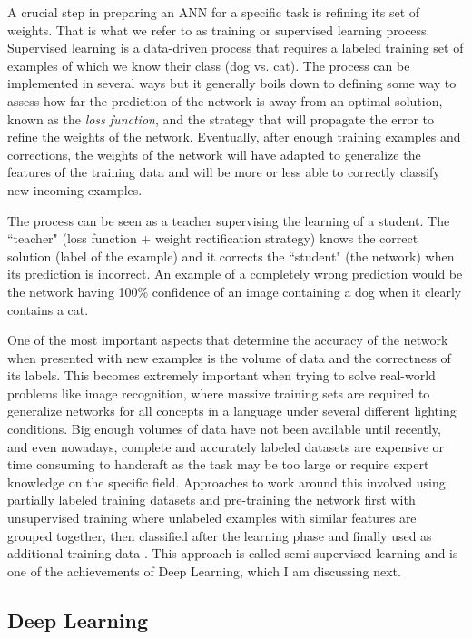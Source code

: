 A crucial step in preparing an ANN for a specific task is refining its set of weights.
That is what we refer to as training or supervised learning process.
Supervised learning is a data-driven process that requires a labeled training set of examples of which we know their class (dog vs. cat).
The process can be implemented in several ways but it generally boils down to defining some way to assess how far the prediction of the network is away from an optimal solution, known as the \emph{loss function}, and the strategy that will propagate the error to refine the weights of the network.
Eventually, after enough training examples and corrections, the weights of the network will have adapted to generalize the features of the training data and will be more or less able to correctly classify new incoming examples.

The process can be seen as a teacher supervising the learning of a student.
The ``teacher" (loss function + weight rectification strategy) knows the correct solution (label of the example) and it corrects the ``student" (the network) when its prediction is incorrect.
An example of a completely wrong prediction would be the network having 100\% confidence of an image containing a dog when it clearly contains a cat.

One of the most important aspects that determine the accuracy of the network when presented with new examples is the volume of data and the correctness of its labels.
This becomes extremely important when trying to solve real-world problems like image recognition, where massive training sets are required to generalize networks for all concepts in a language under several different lighting conditions.
Big enough volumes of data have not been available until recently, and even nowadays, complete and accurately labeled datasets are expensive or time consuming to handcraft as the task may be too large or require expert knowledge on the specific field.
Approaches to work around this involved using partially labeled training datasets and pre-training the network first with unsupervised training where unlabeled examples with similar features are grouped together, then classified after the learning phase and finally used as additional training data \cite{Hinton2006}.
This approach is called semi-supervised learning and is one of the achievements of Deep Learning, which I am discussing next.


\subsection{Deep Learning}
\label{sub:theory:background:deep-learning}

